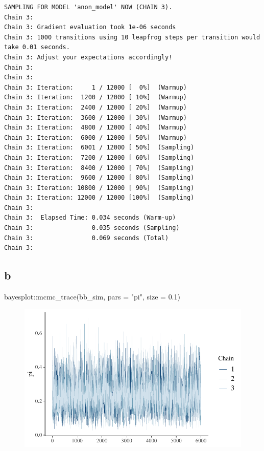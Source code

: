 \documentclass[
  letterpaper,
  DIV=11,
  numbers=noendperiod]{scrartcl}
\newenvironment{Shaded}{\begin{snugshade}}{\end{snugshade}}
\newcommand{\AttributeTok}[1]{\textcolor[rgb]{0.40,0.45,0.13}{#1}}
\newcommand{\FloatTok}[1]{\textcolor[rgb]{0.68,0.00,0.00}{#1}}
\newcommand{\FunctionTok}[1]{\textcolor[rgb]{0.28,0.35,0.67}{#1}}
\newcommand{\NormalTok}[1]{\textcolor[rgb]{0.00,0.23,0.31}{#1}}
\newcommand{\SpecialCharTok}[1]{\textcolor[rgb]{0.37,0.37,0.37}{#1}}
\newcommand{\StringTok}[1]{\textcolor[rgb]{0.13,0.47,0.30}{#1}}
\begin{document}
\begin{verbatim}
SAMPLING FOR MODEL 'anon_model' NOW (CHAIN 3).
Chain 3: 
Chain 3: Gradient evaluation took 1e-06 seconds
Chain 3: 1000 transitions using 10 leapfrog steps per transition would take 0.01 seconds.
Chain 3: Adjust your expectations accordingly!
Chain 3: 
Chain 3: 
Chain 3: Iteration:     1 / 12000 [  0%]  (Warmup)
Chain 3: Iteration:  1200 / 12000 [ 10%]  (Warmup)
Chain 3: Iteration:  2400 / 12000 [ 20%]  (Warmup)
Chain 3: Iteration:  3600 / 12000 [ 30%]  (Warmup)
Chain 3: Iteration:  4800 / 12000 [ 40%]  (Warmup)
Chain 3: Iteration:  6000 / 12000 [ 50%]  (Warmup)
Chain 3: Iteration:  6001 / 12000 [ 50%]  (Sampling)
Chain 3: Iteration:  7200 / 12000 [ 60%]  (Sampling)
Chain 3: Iteration:  8400 / 12000 [ 70%]  (Sampling)
Chain 3: Iteration:  9600 / 12000 [ 80%]  (Sampling)
Chain 3: Iteration: 10800 / 12000 [ 90%]  (Sampling)
Chain 3: Iteration: 12000 / 12000 [100%]  (Sampling)
Chain 3: 
Chain 3:  Elapsed Time: 0.034 seconds (Warm-up)
Chain 3:                0.035 seconds (Sampling)
Chain 3:                0.069 seconds (Total)
Chain 3: 
\end{verbatim}

\hypertarget{b-6}{%
\subsection{b}\label{b-6}}

\begin{Shaded}
\begin{Highlighting}[]
\NormalTok{bayesplot}\SpecialCharTok{::}\FunctionTok{mcmc\_trace}\NormalTok{(bb\_sim, }\AttributeTok{pars =} \StringTok{"pi"}\NormalTok{, }\AttributeTok{size =} \FloatTok{0.1}\NormalTok{)}
\end{Highlighting}
\end{Shaded}

\begin{figure}[H]

{\centering \includegraphics{ps4_code_files/figure-pdf/unnamed-chunk-19-1.pdf}

}

\end{figure}
\end{document}

